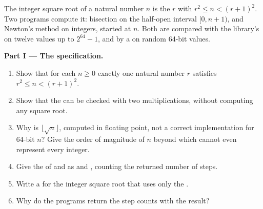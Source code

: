 \begin{problem}\label{pb:b1:program-correctness:1}
The integer square root of a natural number $n$ is the $r$ with $r^2 \leq n < (r + 1)^2$. Two programs compute it:
bisection on the half-open interval $[0, n + 1)$, and Newton's method on integers, started at $n$. Both are compared
with the library's  on twelve values up to $2^{64} - 1$, and by a  on random 64-bit
values.
\label{lst:b1:program-correctness:isqrt}
\label{out:b1:program-correctness:isqrt}

\medskip\noindent\textbf{Part I --- The specification.}
\begin{enumerate}
\item Show that for each $n \geq 0$ exactly one natural number $r$ satisfies $r^2 \leq n < (r + 1)^2$.
\item Show that the  can be checked with two multiplications, without computing any square root.
\item Why is $\lfloor \sqrt{n} \rfloor$, computed in floating point, not a correct implementation for 64-bit $n$? Give
the order of magnitude of $n$ beyond which  cannot even represent every integer.
\item Give the  of  and  as  and ,
counting the returned number of steps.
\item Write a  for the integer square root that uses only the .
\item Why do the programs return the step counts with the result?
\end{enumerate}


\end{problem}
